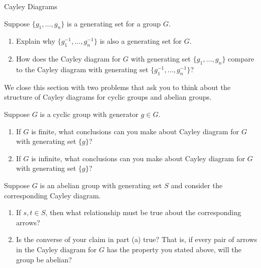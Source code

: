 \begin{section}{Cayley Diagrams}
\begin{problem}
Suppose $\{g_1,\ldots,g_n\}$ is a generating set for a group $G$.
\begin{enumerate}[label=\textrm{(\alph*)}]
\item Explain why $\{g^{-1}_1,\ldots,g^{-1}_n\}$ is also a generating set for $G$.
\item How does the Cayley diagram for $G$ with generating set $\{g_1,\ldots,g_n\}$ compare to the Cayley diagram with generating set $\{g^{-1}_1,\ldots,g^{-1}_n\}$?
\end{enumerate}
\end{problem}

We close this section with two problems that ask you to think about the structure of Cayley diagrams for cyclic groups and abelian groups.

\begin{problem}
Suppose $G$ is a cyclic group with generator $g\in G$.
\begin{enumerate}[label=\textrm{(\alph*)}]
\item If $G$ is finite, what conclusions can you make about Cayley diagram for $G$ with generating set $\{g\}$?
\item If $G$ is infinite, what conclusions can you make about Cayley diagram for $G$ with generating set $\{g\}$?
\end{enumerate}
\end{problem}

\begin{problem}
Suppose $G$ is an abelian group with generating set $S$ and consider the corresponding Cayley diagram.
\begin{enumerate}[label=\textrm{(\alph*)}]
\item If $s,t\in S$, then what relationship must be true about the corresponding arrows?
\item Is the converse of your claim in part (a) true?  That is, if every pair of arrows in the Cayley diagram for $G$ has the property you stated above, will the group be abelian?
\end{enumerate}
\end{problem}

\end{section}